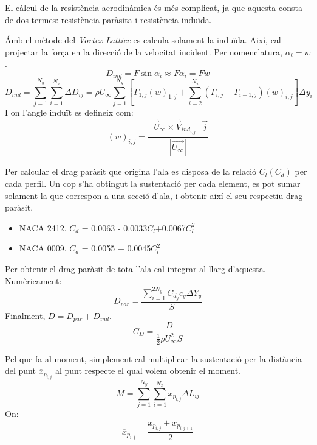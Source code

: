 El càlcul de la resistència aerodinàmica és més complicat, ja que aquesta consta de dos termes: resistència paràsita i resistència induïda.

Ámb el mètode del \textit{Vortex Lattice} es calcula solament la induïda. Així, cal projectar la força en la direcció de la velocitat incident. Per nomenclatura, $\alpha_i = w $.
\begin{equation}
D_{ind}=F\sin{\alpha_i} \approx F\alpha_i = Fw
\end{equation}
\begin{equation}
D_{ind} = \sum_{j=1}^{N_{y}}\sum_{i=1}^{N_{x}}\Delta D_{ij}=\rho U_{\infty}\sum_{j=1}^{N_{y}}\left[\Gamma_{1,j}(w)_{1,j}+\sum_{i=2}^{N_{x}}\left(\Gamma_{i,j}-\Gamma_{i-1,j}\right)(w)_{i,j}\right]\Delta y_{i}
\end{equation}
I on l'angle induït es defineix com:
\begin{equation}
(w)_{i,j}=\frac{\left[\vec{U}_{\infty} \times \vec{V}_{ind_{i,j}}\right]\vec{j}}{|\vec{U_{\infty}}|}
\end{equation}

Per calcular el drag paràsit que origina l'ala es disposa de la relació $C_l(C_d)$ per cada perfil. Un cop s'ha obtingut la sustentació per cada element, es pot sumar solament la que correspon a una secció d'ala, i obtenir així el seu respectiu drag paràsit.
\begin{itemize}
	\item NACA 2412. $C_d$ = 0.0063 - 0.0033$C_l$+0.0067$C_{l}^2$
	\item NACA 0009. $C_d$ = 0.0055 + 0.0045$C_{l}^2$
\end{itemize}
Per obtenir el drag paràsit de tota l'ala cal integrar al llarg d'aquesta. Numèricament:
\begin{equation}
D_{par}=\frac{\sum_{i=1}^{2N_{y}}C_{d_y}c_y\Delta Y_y}{S}
\end{equation}
Finalment, $ D = D_{par} + D_{ind}$.
\begin{equation}
C_{D}=\frac{D}{\frac{1}{2}\rho U_{\infty}^{2}S}
\end{equation}

Pel que fa al moment, simplement cal multiplicar la sustentació per la distància del punt $\overline{x}_{p_{i,j}}$ al punt respecte el qual volem obtenir el moment.
\begin{equation}
M = \sum_{j=1}^{N_{y}}\sum_{i=1}^{N_{x}}\overline{x}_{p_{i,j}}\Delta L_{ij}
\end{equation}
On:
\begin{equation}
\overline{x}_{p_{i,j}} = \frac{x_{p_{i,j}} + x_{p_{i,j+1}} }{2}
\end{equation}
